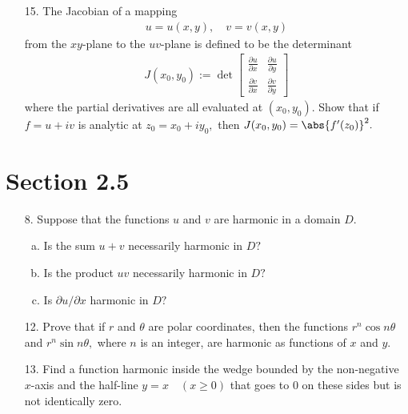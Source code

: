 \documentclass{article}
\begin{document}
\begin{itemize}
	\item[15.] The Jacobian of a mapping 
		\begin{align*}
			u=u(x, y), \quad v=v(x, y)
		\end{align*}
		from the $xy$-plane to the $uv$-plane is defined to be the determinant
		\begin{align*}
			J(x_0, y_0) := \det{\begin{bmatrix}
				\frac{\partial u}{\partial x} & \frac{\partial u}{\partial y} \\
				\frac{\partial v}{\partial x} & \frac{\partial v}{\partial y}
		\end{bmatrix}}
		\end{align*}
		where the partial derivatives are all evaluated at $(x_0, y_0).$ Show that if $f=u+iv$ is analytic at $z_0=x_0+iy_0,$ then $J(x_0, y_0)=\abs{f'(z_0)}^2.$
		
\end{itemize}

\section*{Section 2.5}

\begin{itemize}
	\item[8.] Suppose that the functions $u$ and $v$ are harmonic in a domain $D.$
		\begin{enumerate}[(a)]
			\item Is the sum $u+v$ necessarily harmonic in $D?$

			\item Is the product $uv$ necessarily harmonic in $D?$

			\item Is $\partial u/\partial x$ harmonic in $D?$
				
		\end{enumerate}

	\item[12.] Prove that if $r$ and $\theta$ are polar coordinates, then the functions $r^n \cos n\theta$ and $r^n\sin n\theta,$ where $n$ is an integer, are harmonic as functions of $x$ and $y.$

	\item[13.] Find a function harmonic inside the wedge bounded by the non-negative $x$-axis and the half-line $y=x\quad(x\ge 0)$ that goes to 0 on these sides but is not identically zero. 
		
\end{itemize}
\end{document}
